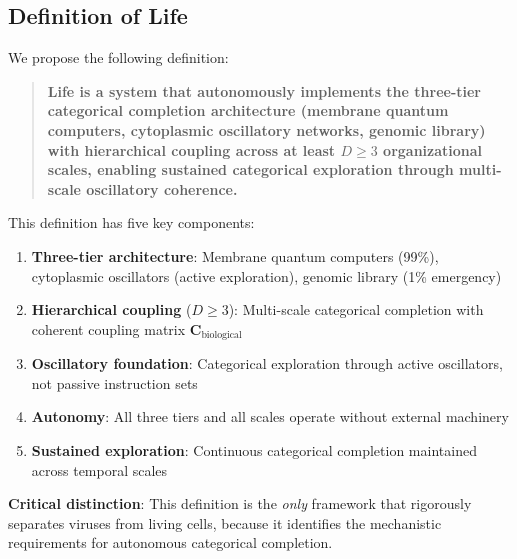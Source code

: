 \documentclass[11pt]{article}
\begin{document}
\subsection{Definition of Life}

We propose the following definition:

\begin{quote}
\textbf{Life is a system that autonomously implements the three-tier categorical completion architecture (membrane quantum computers, cytoplasmic oscillatory networks, genomic library) with hierarchical coupling across at least $D \geq 3$ organizational scales, enabling sustained categorical exploration through multi-scale oscillatory coherence.}
\end{quote}

This definition has five key components:

\begin{enumerate}
\item \textbf{Three-tier architecture}: Membrane quantum computers (99\%), cytoplasmic oscillators (active exploration), genomic library (1\% emergency)
\item \textbf{Hierarchical coupling} ($D \geq 3$): Multi-scale categorical completion with coherent coupling matrix $\mathbf{C}_{\text{biological}}$
\item \textbf{Oscillatory foundation}: Categorical exploration through active oscillators, not passive instruction sets
\item \textbf{Autonomy}: All three tiers and all scales operate without external machinery
\item \textbf{Sustained exploration}: Continuous categorical completion maintained across temporal scales
\end{enumerate}

\textbf{Critical distinction}: This definition is the \textit{only} framework that rigorously separates viruses from living cells, because it identifies the mechanistic requirements for autonomous categorical completion.
\end{document}
